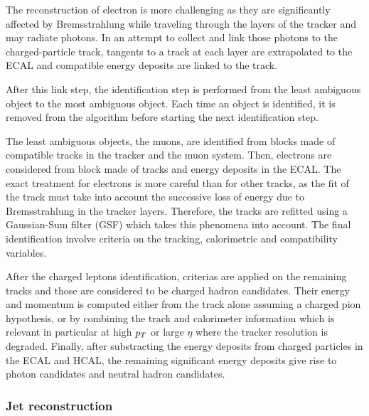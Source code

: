         The reconstruction of electron is more challenging as they are significantly
        affected by Bremsstrahlung while traveling through the layers of the tracker
        and may radiate photons. In an attempt to collect and link those photons to the
        charged-particle track, tangents to a track at each layer are extrapolated to the
        ECAL and compatible energy deposits are linked to the track.

        After this link step, the identification step is performed from the least ambiguous
        object to the most ambiguous object. Each time an object is identified, it is
        removed from the algorithm before starting the next identification step.

        The least ambiguous objects, the muons, are identified from blocks made of compatible
        tracks in the tracker and the muon system. Then, electrons are considered from
        block made of tracks and energy deposits in the ECAL. The exact treatment for
        electrons is more careful than for other tracks, as the fit of the track must take
        into account the successive loss of energy due to Bremsstrahlung in the tracker
        layers. Therefore, the tracks are refitted using a Gaussian-Sum filter (GSF)
        \cite{GSFelectrons} which takes this phenomena into account. The final identification
        involve criteria on the tracking, calorimetric and compatibility variables.

        After the charged leptons identification, criterias are applied on the remaining
        tracks and those are considered to be charged hadron candidates. Their energy
        and momentum is computed either from the track alone assuming a charged pion
        hypothesis, or by combining the track and calorimeter information which is relevant
        in particular at high $p_T$ or large $\eta$ where the tracker resolution is
        degraded. Finally, after substracting the energy deposits from charged particles
        in the ECAL and HCAL, the remaining significant energy deposits give rise to photon
        candidates and neutral hadron candidates.

        \subsubsection{Jet reconstruction \label{sec:jetReconstruction}}

